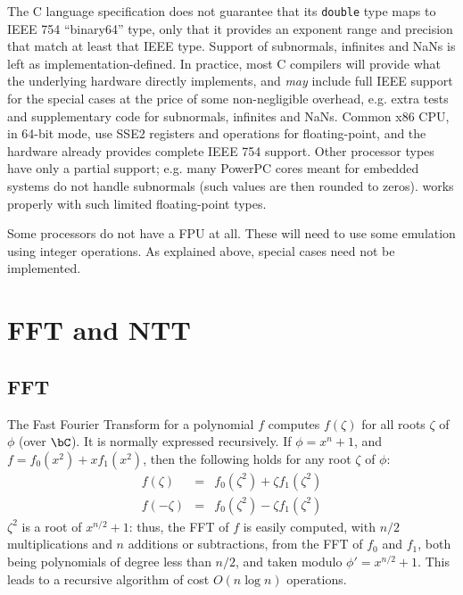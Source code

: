 The C language specification does not guarantee that its \verb+double+
type maps to IEEE 754 ``binary64'' type, only that it provides an
exponent range and precision that match at least that IEEE type. Support
of subnormals, infinites and NaNs is left as implementation-defined. In
practice, most C compilers will provide what the underlying hardware
directly implements, and \emph{may} include full IEEE support for the
special cases at the price of some non-negligible overhead, e.g. extra
tests and supplementary code for subnormals, infinites and NaNs. Common
x86 CPU, in 64-bit mode, use SSE2 registers and operations for
floating-point, and the hardware already provides complete IEEE 754
support. Other processor types have only a partial support; e.g. many
PowerPC cores meant for embedded systems do not handle subnormals (such
values are then rounded to zeros). \falcon works properly with such
limited floating-point types.

Some processors do not have a FPU at all. These will need to use
some emulation using integer operations. As explained above, special
cases need not be implemented.

\section{FFT and NTT}

\subsection{FFT}


The Fast Fourier Transform for a polynomial $f$ computes $f(\zeta)$
for all roots $\zeta$ of $\phi$ (over $\bC$). It is normally expressed
recursively. If $\phi = x^n+1$, and $f = f_0(x^2) + xf_1(x^2)$, then
the following holds for any root $\zeta$ of $\phi$:
\begin{equation}
  \begin{array}{rcl}
     f(\zeta) &=& f_0(\zeta^2) + \zeta f_1(\zeta^2) \\
     f(-\zeta) &=& f_0(\zeta^2) - \zeta f_1(\zeta^2)
  \end{array}
\end{equation}
$\zeta^2$ is a root of $x^{n/2}+1$: thus, the FFT of $f$ is easily
computed, with $n/2$ multiplications and $n$ additions or subtractions,
from the FFT of $f_0$ and $f_1$, both being polynomials of degree less
than $n/2$, and taken modulo $\phi' = x^{n/2}+1$. This leads to a
recursive algorithm of cost $O(n \log n)$ operations.

